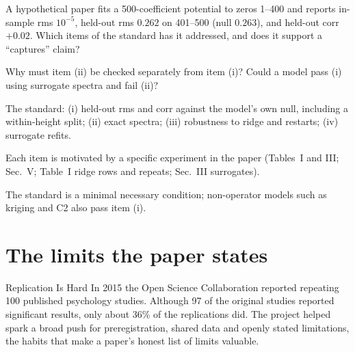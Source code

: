 \begin{checkpoint}
A hypothetical paper fits a 500-coefficient potential to zeros 1--400 and reports in-sample rms $10^{-5}$, held-out rms $0.262$ on 401--500 (null $0.263$), and held-out corr $+0.02$. Which items of the standard has it addressed, and does it support a ``captures'' claim?
\end{checkpoint}

\begin{checkpoint}
Why must item (ii) be checked separately from item (i)? Could a model pass (i) using surrogate spectra and fail (ii)?
\end{checkpoint}

\begin{keyideas}
\item The standard: (i) held-out rms and corr against the model's own null, including a within-height split; (ii) exact spectra; (iii) robustness to ridge and restarts; (iv) surrogate refits.
\item Each item is motivated by a specific experiment in the paper (Tables~I and III; Sec.~V; Table~I ridge rows and repeats; Sec.~III surrogates).
\item The standard is a minimal necessary condition; non-operator models such as kriging and C2 also pass item (i).
\end{keyideas}

\section{The limits the paper states}\label{sec:paper-critique-limits}
\begin{didyouknow}{Replication Is Hard}
In 2015 the Open Science Collaboration reported repeating 100 published psychology studies. Although 97 of the original studies reported significant results, only about 36\% of the replications did. The project helped spark a broad push for preregistration, shared data and openly stated limitations, the habits that make a paper's honest list of limits valuable.
\end{didyouknow}

